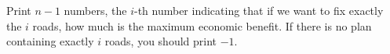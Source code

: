 Print $n-1$ numbers, the $i$-th number indicating that if we want 
to fix exactly the $i$ roads, how much is the maximum economic benefit.
If there is no plan containing exactly $i$ roads, you should print $-1$.
